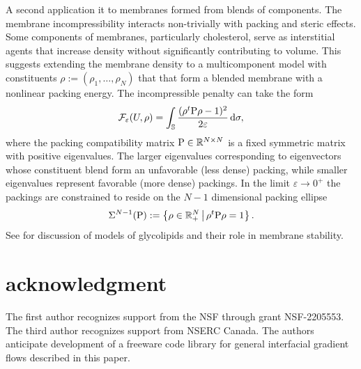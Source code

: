\documentclass[11pt]{amsart}
\theoremstyle{plain}
\def\cF{{\mathcal F}}
\def\mbbR{\mathbb{R}}
\def\mbbS{\mathbb{S}}
\def\mrP{\textrm P}
\def\mrd{\textrm d}
\def\eps{\varepsilon}
\def\cF{{\mathcal F}}
\numberwithin{equation}{section}
\theoremstyle{plain}
\begin{document}
A second application it to membranes formed from blends of components. The membrane incompressibility interacts non-trivially with packing and steric effects. Some components of membranes, particularly cholesterol, serve as interstitial agents that increase density without significantly contributing to volume. This suggests extending the membrane density to a multicomponent model with constituents $\rho:=(\rho_{1},\ldots, \rho_{N})$ that that form a blended membrane with a 
nonlinear packing energy. The incompressible penalty can take the form
$$ \cF_{\eps}(U,\rho)=\int_\mbbS \frac {( \rho^t \mrP \rho  -1)^2}{2\eps}\, \mrd \sigma,$$
where the packing compatibility matrix $\mrP\in\mbbR^{N\times N}$ is a fixed symmetric matrix with positive eigenvalues. The larger eigenvalues corresponding to eigenvectors whose constituent blend form an unfavorable (less dense) packing, while smaller eigenvalues represent favorable (more dense) packings. In the limit $\eps\to0^+$ the packings are constrained to reside on the $N-1$ dimensional packing ellipse
$$\Sigma^{N-1}(\mrP):=\left\{\rho\in\mbbR^N_+\,\bigl|\, \rho^t\mrP\rho=1\right\}.$$ See \cite{CDPV-20} for discussion of models of glycolipids and their role in membrane stability.



\section*{acknowledgment}
The first author recognizes support from the NSF through grant NSF-2205553. The third author recognizes support from NSERC Canada. The authors anticipate development of a freeware code library for general interfacial gradient flows described in this paper.
\end{document}
